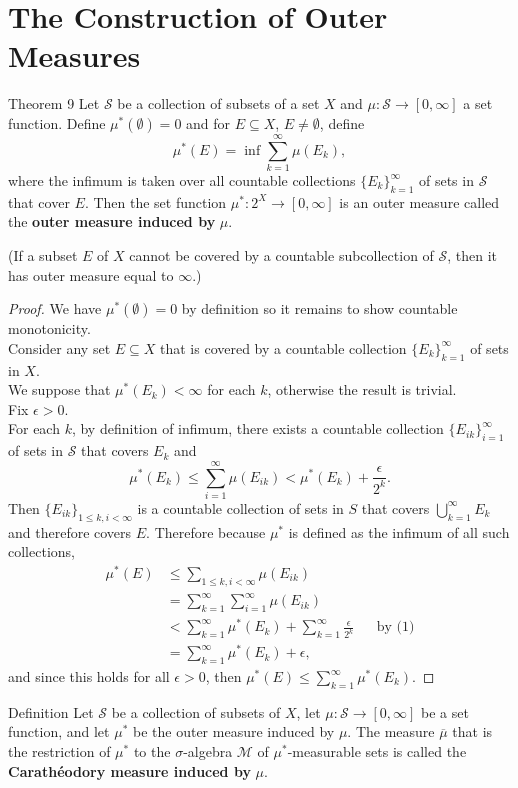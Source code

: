\section{The Construction of Outer Measures}
\begin{namedthm*}{Theorem 9}
	Let $\mathcal{S}$ be a collection of subsets of a set $X$ and $\mu:\mathcal{S}\to[0,\infty]$ a set function.
	Define $\mu^*(\emptyset)=0$ and for $E\subseteq X$, $E\neq\emptyset$, define
	\[
		\mu^*(E)=\inf\sum_{k=1}^\infty\mu(E_k),
	\]
	where the infimum is taken over all countable collections $\{E_k\}_{k=1}^\infty$ of sets in $\mathcal{S}$ that cover $E$.
	Then the set function $\mu^*:2^X\to[0,\infty]$ is an outer measure called the \textbf{outer measure induced by} $\mu$.
\end{namedthm*}
(If a subset $E$ of $X$ cannot be covered by a countable subcollection of $\mathcal{S}$, then it has outer measure equal to $\infty$.)
\begin{proof}
	We have $\mu^*(\emptyset)=0$ by definition so it remains to show countable monotonicity.
	\\Consider any set $E\subseteq X$ that is covered by a countable collection $\{E_k\}_{k=1}^\infty$ of sets in $X$. 
	\\We suppose that $\mu^*(E_k)<\infty$ for each $k$, otherwise the result is trivial.
	\\Fix $\epsilon>0$.
	\\For each $k$, by definition of infimum, there exists a countable collection $\{E_{ik}\}_{i=1}^\infty$ of sets in $\mathcal{S}$ that covers $E_k$ and
	\[
		\mu^*(E_k)\le\sum_{i=1}^\infty\mu(E_{ik})<\mu^*(E_k)+\frac{\epsilon}{2^k}.\tag{1}
	\]
	Then $\{E_{ik}\}_{1\le k,i<\infty}$ is a countable collection of sets in $S$ that covers $\bigcup_{k=1}^\infty E_k$ and therefore covers $E$.
	Therefore because $\mu^*$ is defined as the infimum of all such collections,
	\begin{align*}
		\mu^*(E)&\le\sum_{1\le k,i<\infty}\mu(E_{ik})\\
		&=\sum_{k=1}^\infty\sum_{i=1}^\infty\mu(E_{ik})\\
		&<\sum_{k=1}^\infty\mu^*(E_k)+\sum_{k=1}^\infty\frac{\epsilon}{2^k}&&\text{by (1)}\\
		&=\sum_{k=1}^\infty\mu^*(E_k)+\epsilon,
	\end{align*}
	and since this holds for all $\epsilon>0$, then $\mu^*(E)\le\sum_{k=1}^\infty\mu^*(E_k)$.
\end{proof}
\begin{namedthm*}{Definition}
	Let $\mathcal{S}$ be a collection of subsets of $X$, let $\mu:\mathcal{S}\to[0,\infty]$ be a set function, and let $\mu^*$ be the outer measure induced by $\mu$.
	The measure $\overline{\mu}$ that is the restriction of $\mu^*$ to the $\sigma$-algebra $\mathcal{M}$ of $\mu^*$-measurable sets is called the \textbf{Carath\'eodory measure induced by} $\mu$.
\end{namedthm*}
